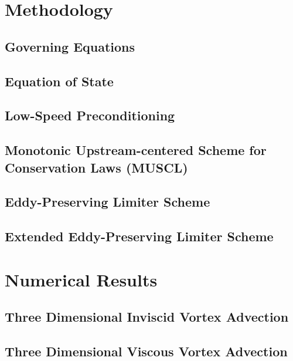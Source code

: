 \documentclass[twocolumn,10pt]{asme2ej}
\begin{document}
\section{Methodology}

\subsection{Governing Equations}


\subsection{Equation of State}


\subsection{Low-Speed Preconditioning}


\subsection{Monotonic Upstream-centered Scheme for Conservation Laws (MUSCL)}


\subsection{Eddy-Preserving Limiter Scheme}


\subsection{Extended Eddy-Preserving Limiter Scheme}

\section{Numerical Results} 

\subsection{Three Dimensional Inviscid Vortex Advection}

\subsection{Three Dimensional Viscous Vortex Advection}

\end{document}
